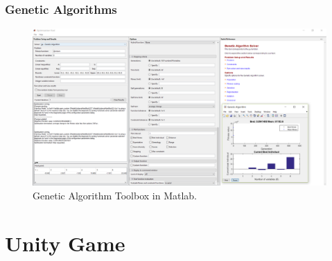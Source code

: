 \documentclass{beamer}
\begin{document}
\begin{frame}
\frametitle{Genetic Algorithms}
\begin{figure}[H]
	\centering
	\includegraphics[scale = 0.25]{fig/GApoly.PNG}
	\caption{Genetic Algorithm Toolbox in Matlab.}
	\label{GA toolbox poly}
\end{figure}
\end{frame}

\section{Unity Game}

\end{document}
